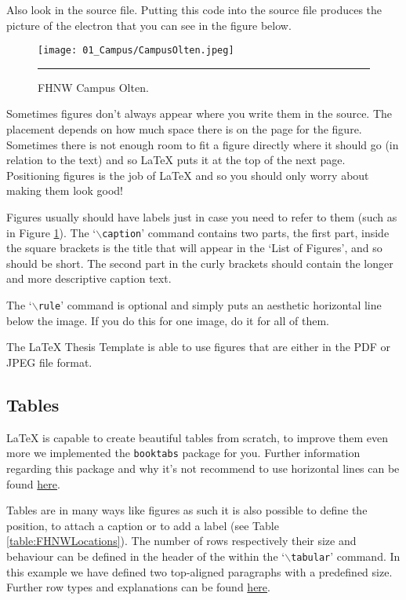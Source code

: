 Also look in the source file. Putting this code into the source file produces the picture of the electron that you can see in the figure below.

\begin{figure}[htbp]
	\centering
		\texttt{[image: 01\_Campus/CampusOlten.jpeg]}
		\rule{35em}{0.5pt}
	\caption[Campus Olten]{FHNW Campus Olten.}
	\label{fig:Campus}
\end{figure}

Sometimes figures don't always appear where you write them in the source. The placement depends on how much space there is on the page for the figure. Sometimes there is not enough room to fit a figure directly where it should go (in relation to the text) and so \LaTeX{} puts it at the top of the next page. Positioning figures is the job of \LaTeX{} and so you should only worry about making them look good!

Figures usually should have labels just in case you need to refer to them (such as in Figure \ref{fig:Campus}). The `$\backslash$\texttt{caption}' command contains two parts, the first part, inside the square brackets is the title that will appear in the `List of Figures', and so should be short. The second part in the curly brackets should contain the longer and more descriptive caption text.

The `$\backslash$\texttt{rule}' command is optional and simply puts an aesthetic horizontal line below the image. If you do this for one image, do it for all of them.

The \LaTeX{} Thesis Template is able to use figures that are either in the PDF or JPEG file format.

\subsection{Tables}

\LaTeX{} is capable to create beautiful tables from scratch, to improve them even more we implemented the \texttt{booktabs} package for you. Further information regarding this package and why it's not recommend to use horizontal lines can be found \href{http://texdoc.net/texmf-dist/doc/latex/booktabs/booktabs.pdf}{here}.

Tables are in many ways like figures as such it is also possible to define the position, to attach a caption or to add a label (see Table \ref{table:FHNWLocations}). The number of rows respectively their size and behaviour can be defined in the header of the within the `$\backslash$\texttt{tabular}' command. In this example we have defined two top-aligned paragraphs with a predefined size. Further row types and explanations can be found \href{http://en.wikibooks.org/wiki/LaTeX/Tables}{here}. 

